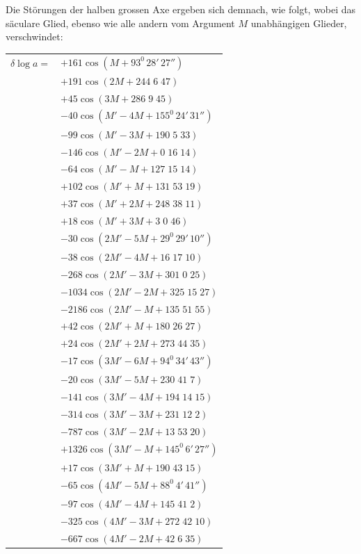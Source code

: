 \begin{landscape}
\begin{center}
\end{center}
\endgroup
\par\noindent\hspace*{\parindent}Die Störungen der halben grossen Axe ergeben sich demnach, wie folgt, wobei das säculare Glied, ebenso wie alle andern vom Argument \(M\) unabhängigen Glieder, verschwindet:
\begingroup
\renewcommand{\arraystretch}{1.15}
\begin{longtable}{@{}r@{}l@{}}
\(\delta\log a={}\)&\(+161\cos(M+93^0\,28'\,27'')\)\\
&\(+191\cos(2M+244\;6\;47)\)\\
&\(+45\cos(3M+286\;9\;45)\)\\[3pt]
&\(-40\cos(M'-4M+155^0\,24'\,31'')\)\\
&\(-99\cos(M'-3M+190\;5\;33)\)\\
&\(-146\cos(M'-2M+0\;16\;14)\)\\
&\(-64\cos(M'-M+127\;15\;14)\)\\
&\(+102\cos(M'+M+131\;53\;19)\)\\
&\(+37\cos(M'+2M+248\;38\;11)\)\\
&\(+18\cos(M'+3M+3\;0\;46)\)\\[3pt]
&\(-30\cos(2M'-5M+29^0\,29'\,10'')\)\\
&\(-38\cos(2M'-4M+16\;17\;10)\)\\
&\(-268\cos(2M'-3M+301\;0\;25)\)\\
&\(-1034\cos(2M'-2M+325\;15\;27)\)\\
&\(-2186\cos(2M'-M+135\;51\;55)\)\\
&\(+42\cos(2M'+M+180\;26\;27)\)\\
&\(+24\cos(2M'+2M+273\;44\;35)\)\\[3pt]
&\(-17\cos(3M'-6M+94^0\,34'\,43'')\)\\
&\(-20\cos(3M'-5M+230\;41\;7)\)\\
&\(-141\cos(3M'-4M+194\;14\;15)\)\\
&\(-314\cos(3M'-3M+231\;12\;2)\)\\
&\(-787\cos(3M'-2M+13\;53\;20)\)\\
&\(+1326\cos(3M'-M+145^0\,6'\,27'')\)\\
&\(+17\cos(3M'+M+190\;43\;15)\)\\[3pt]
&\(-65\cos(4M'-5M+88^0\,4'\,41'')\)\\
&\(-97\cos(4M'-4M+145\;41\;2)\)\\
&\(-325\cos(4M'-3M+272\;42\;10)\)\\
&\(-667\cos(4M'-2M+42\;6\;35)\)\\

\end{longtable}
\end{landscape}
